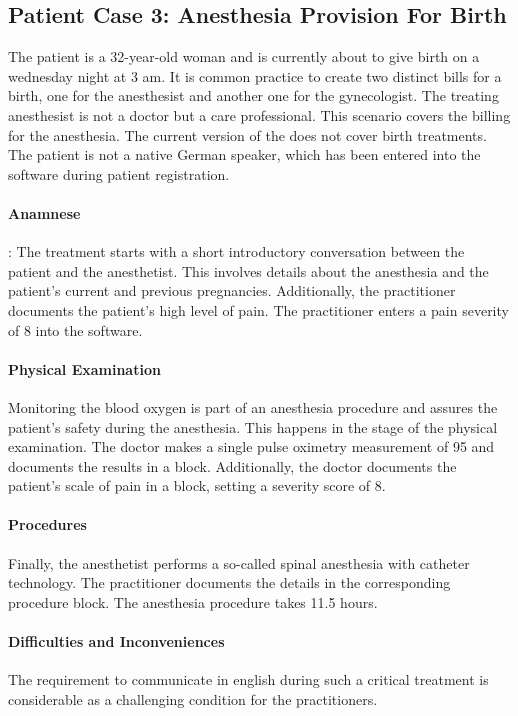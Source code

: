 \subsection{Patient Case 3: Anesthesia Provision For Birth}\label{subsec:patient-case-3:-anesthesia-for-birth}
The patient is a 32-year-old woman and is currently about to give birth on a wednesday night at 3 am.
It is common practice to create two distinct bills for a birth, one for the anesthesist and another one for the gynecologist.
The treating anesthesist is not a doctor but a care professional.
This scenario covers the billing for the anesthesia.
The current version of the \AVS does not cover birth treatments.
The patient is not a native German speaker, which has been entered into the software during patient registration.

\paragraph{Anamnese}:
The treatment starts with a short introductory conversation between the patient and the anesthetist.
This involves details about the anesthesia and the patient's current and previous pregnancies.
Additionally, the practitioner documents the patient's high level of pain.
The practitioner enters a pain severity of 8 into the software.

\paragraph{Physical Examination}
Monitoring the blood oxygen is part of an anesthesia procedure and assures the patient's safety during the anesthesia.
This happens in the stage of the physical examination.
The doctor makes a single pulse oximetry measurement of 95 and documents the results in a  block.
Additionally, the doctor documents the patient's scale of pain in a  block,
setting a severity score of 8.

\paragraph{Procedures}
Finally, the anesthetist performs a so-called spinal anesthesia with catheter technology.
The practitioner documents the details in the corresponding  procedure block.
The anesthesia procedure takes 11.5 hours.

\paragraph{Difficulties and Inconveniences}
The requirement to communicate in english during such a critical treatment is considerable as a challenging condition for the practitioners.

